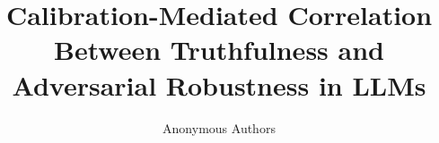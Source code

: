 \documentclass[10pt]{article}
\title{Calibration-Mediated Correlation Between Truthfulness and Adversarial Robustness in LLMs}
\author{Anonymous Authors}
\date{}
\begin{document}
\maketitle

\begin{abstract}

\end{abstract}












\appendix

\end{document}
